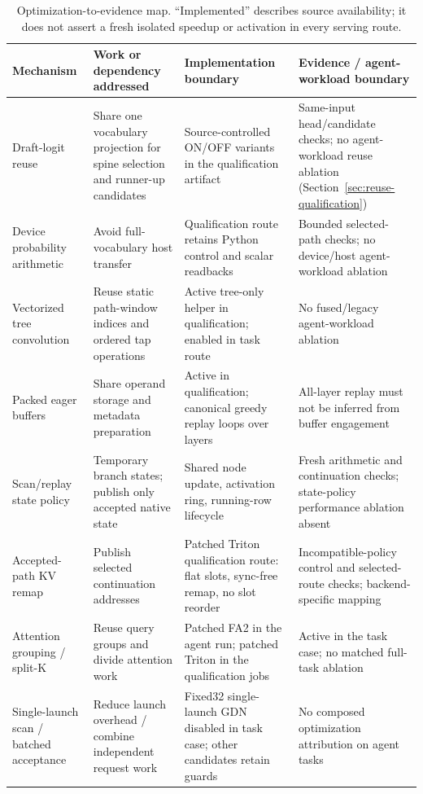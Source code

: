\documentclass[conference]{IEEEtran}
\begin{document}
\begin{table}[t]
\caption{Optimization-to-evidence map. ``Implemented'' describes source availability; it does not assert a fresh isolated speedup or activation in every serving route.}
\label{tab:optimization-map}
\centering\footnotesize
\begin{tabularx}{\textwidth}{@{}p{}p{}YY@{}}
\toprule
Mechanism & Work or dependency addressed & Implementation boundary & Evidence / agent-workload boundary \\
\midrule
Draft-logit reuse & Share one vocabulary projection for spine selection and runner-up candidates & Source-controlled ON/OFF variants in the qualification artifact & Same-input head/candidate checks; no agent-workload reuse ablation (Section~\ref{sec:reuse-qualification}) \\
Device probability arithmetic & Avoid full-vocabulary host transfer & Qualification route retains Python control and scalar readbacks & Bounded selected-path checks; no device/host agent-workload ablation \\
Vectorized tree convolution & Reuse static path-window indices and ordered tap operations & Active tree-only helper in qualification; enabled in task route & No fused/legacy agent-workload ablation \\
Packed eager buffers & Share operand storage and metadata preparation & Active in qualification; canonical greedy replay loops over layers & All-layer replay must not be inferred from buffer engagement \\
Scan/replay state policy & Temporary branch states; publish only accepted native state & Shared node update, activation ring, running-row lifecycle & Fresh arithmetic and continuation checks; state-policy performance ablation absent \\
Accepted-path KV remap & Publish selected continuation addresses & Patched Triton qualification route: flat slots, sync-free remap, no slot reorder & Incompatible-policy control and selected-route checks; backend-specific mapping \\
Attention grouping / split-K & Reuse query groups and divide attention work & Patched FA2 in the agent run; patched Triton in the qualification jobs & Active in the task case; no matched full-task ablation \\
Single-launch scan / batched acceptance & Reduce launch overhead / combine independent request work & Fixed32 single-launch GDN disabled in task case; other candidates retain guards & No composed optimization attribution on agent tasks \\
\bottomrule
\end{tabularx}
\end{table}
\end{document}
